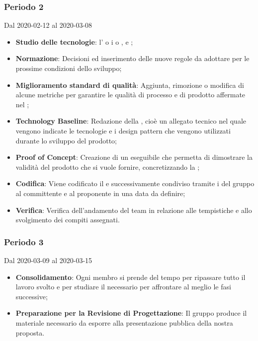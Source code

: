 \subsubsection{Periodo 2} 
Dal 2020-02-12 al 2020-03-08
\begin{itemize}
	\item \textbf{Studio delle tecnologie}: l'  o i   o ,  e ;
	\item \textbf{Normazione}: Decisioni ed inserimento delle nuove regole da adottare per le prossime condizioni dello sviluppo;
	\item \textbf{Miglioramento standard di qualità}: Aggiunta, rimozione o modifica di alcune metriche per garantire le qualità di processo e di prodotto affermate nel \PdQ{};
	\item \textbf{Technology Baseline}: Redazione della , cioè un allegato tecnico nel quale vengono indicate le tecnologie e i design pattern che vengono utilizzati durante lo sviluppo del prodotto;
	\item \textbf{Proof of Concept}: Creazione di un eseguibile che permetta di dimostrare la validità del prodotto che si vuole fornire, concretizzando la ;
	\item \textbf{Codifica}: Viene codificato il  e successivamente condiviso tramite i  del gruppo al committente e al proponente in una data da definire;
	\item \textbf{Verifica}: Verifica dell'andamento del team in relazione alle tempistiche e allo svolgimento dei compiti assegnati.
\end{itemize}
\subsubsection{Periodo 3} 
Dal 2020-03-09 al 2020-03-15
\begin{itemize}
	\item \textbf{Consolidamento}: Ogni membro si prende del tempo per ripassare tutto il lavoro svolto e per studiare il necessario per affrontare al meglio le fasi successive;
	\item \textbf{Preparazione per la Revisione di Progettazione}: Il gruppo produce il materiale necessario da esporre alla presentazione pubblica della nostra proposta.
\end{itemize}

